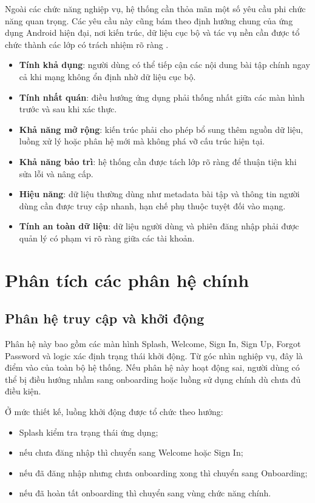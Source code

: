Ngoài các chức năng nghiệp vụ, hệ thống cần thỏa mãn một số yêu cầu phi chức năng quan trọng. Các yêu cầu này cũng bám theo định hướng chung của ứng dụng Android hiện đại, nơi kiến trúc, dữ liệu cục bộ và tác vụ nền cần được tổ chức thành các lớp có trách nhiệm rõ ràng \cite{android_jetpack,android_room,android_workmanager}.

\begin{itemize}
    \item \textbf{Tính khả dụng}: người dùng có thể tiếp cận các nội dung bài tập chính ngay cả khi mạng không ổn định nhờ dữ liệu cục bộ.
    \item \textbf{Tính nhất quán}: điều hướng ứng dụng phải thống nhất giữa các màn hình trước và sau khi xác thực.
    \item \textbf{Khả năng mở rộng}: kiến trúc phải cho phép bổ sung thêm nguồn dữ liệu, luồng xử lý hoặc phân hệ mới mà không phá vỡ cấu trúc hiện tại.
    \item \textbf{Khả năng bảo trì}: hệ thống cần được tách lớp rõ ràng để thuận tiện khi sửa lỗi và nâng cấp.
    \item \textbf{Hiệu năng}: dữ liệu thường dùng như metadata bài tập và thông tin người dùng cần được truy cập nhanh, hạn chế phụ thuộc tuyệt đối vào mạng.
    \item \textbf{Tính an toàn dữ liệu}: dữ liệu người dùng và phiên đăng nhập phải được quản lý có phạm vi rõ ràng giữa các tài khoản.
\end{itemize}

\section{Phân tích các phân hệ chính}

\subsection{Phân hệ truy cập và khởi động}

Phân hệ này bao gồm các màn hình Splash, Welcome, Sign In, Sign Up, Forgot Password và logic xác định trạng thái khởi động. Từ góc nhìn nghiệp vụ, đây là điểm vào của toàn bộ hệ thống. Nếu phân hệ này hoạt động sai, người dùng có thể bị điều hướng nhầm sang onboarding hoặc luồng sử dụng chính dù chưa đủ điều kiện.

Ở mức thiết kế, luồng khởi động được tổ chức theo hướng:

\begin{itemize}
    \item Splash kiểm tra trạng thái ứng dụng;
    \item nếu chưa đăng nhập thì chuyển sang Welcome hoặc Sign In;
    \item nếu đã đăng nhập nhưng chưa onboarding xong thì chuyển sang Onboarding;
    \item nếu đã hoàn tất onboarding thì chuyển sang vùng chức năng chính.
\end{itemize}


